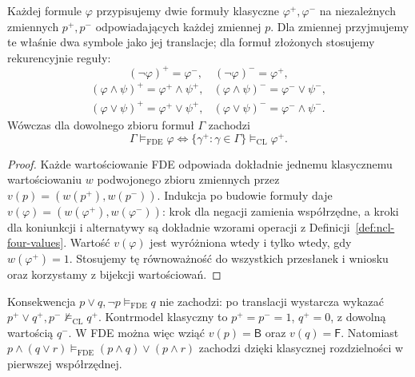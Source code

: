 \begin{twierdzenie}
\label{thm:ncl-four-boolean-translation}
Każdej formule $\varphi$ przypisujemy dwie formuły
klasyczne $\varphi^+,\varphi^-$ na niezależnych zmiennych
$p^+,p^-$ odpowiadających każdej zmiennej $p$.
Dla zmiennej przyjmujemy te właśnie dwa symbole
jako jej translacje; dla formuł złożonych stosujemy
rekurencyjnie reguły:
\[
 (\neg\varphi)^+=\varphi^-,\quad
 (\neg\varphi)^-=\varphi^+,
\]
\[
\begin{array}{ll}
 (\varphi\wedge\psi)^+=\varphi^+\wedge\psi^+,&
 (\varphi\wedge\psi)^-=\varphi^-\vee\psi^-,\\
 (\varphi\vee\psi)^+=\varphi^+\vee\psi^+,&
 (\varphi\vee\psi)^-=\varphi^-\wedge\psi^-.
\end{array}
\]
Wówczas dla dowolnego zbioru formuł $\Gamma$ zachodzi
\[
 \Gamma\models_{\mathrm{FDE}}\varphi
 \iff \{\gamma^+:\gamma\in\Gamma\}
        \models_{\mathrm{CL}}\varphi^+.
\]
\end{twierdzenie}
\begin{proof}
Każde wartościowanie FDE odpowiada dokładnie jednemu
klasycznemu wartościowaniu $w$ podwojonego zbioru
zmiennych przez $v(p)=(w(p^+),w(p^-))$.
Indukcja po budowie formuły daje
$v(\varphi)=(w(\varphi^+),w(\varphi^-))$:
krok dla negacji zamienia współrzędne, a kroki dla
koniunkcji i alternatywy są dokładnie wzorami operacji
z Definicji~\ref{def:ncl-four-values}.
Wartość $v(\varphi)$ jest wyróżniona wtedy i tylko wtedy,
gdy $w(\varphi^+)=1$. Stosujemy tę równoważność
do wszystkich przesłanek i wniosku oraz korzystamy
z bijekcji wartościowań.
\end{proof}

\begin{przyklad}
\label{ex:ncl-four-disjunctive-syllogism}
Konsekwencja $p\vee q,\neg p\models_{\mathrm{FDE}}q$
nie zachodzi: po translacji wystarcza wykazać
$p^+\vee q^+,p^-\not\models_{\mathrm{CL}}q^+$.
Kontrmodel klasyczny to $p^+=p^-=1$, $q^+=0$,
z dowolną wartością $q^-$. W FDE można więc
wziąć $v(p)=\mathsf B$ oraz $v(q)=\mathsf F$.
Natomiast $p\wedge(q\vee r)\models_{\mathrm{FDE}}
(p\wedge q)\vee(p\wedge r)$ zachodzi dzięki
klasycznej rozdzielności w pierwszej współrzędnej.
\end{przyklad}

